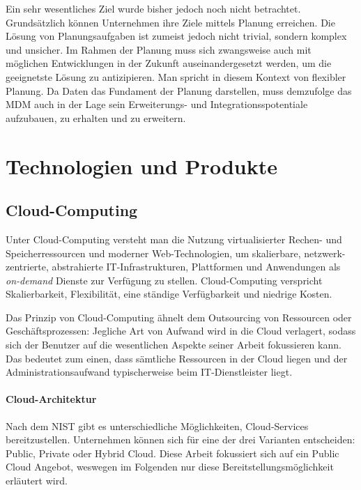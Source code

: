 Ein sehr wesentliches Ziel wurde bisher jedoch noch nicht betrachtet. Grundsätzlich können Unternehmen ihre Ziele mittels Planung erreichen. Die Lösung von Planungsaufgaben ist zumeist jedoch nicht trivial, sondern komplex und unsicher. Im Rahmen der Planung muss sich zwangsweise auch mit möglichen Entwicklungen in der Zukunft auseinandergesetzt werden, um die geeignetste Lösung zu antizipieren. Man spricht in diesem Kontext von flexibler Planung. Da Daten das Fundament der Planung darstellen, muss demzufolge das \ac{MDM} auch in der Lage sein Erweiterungs- und Integrationsspotentiale aufzubauen, zu erhalten und zu erweitern. 
\autocite{Keuper.2010}
% 
% 
% 
% 
% 
% 
\section{Technologien und Produkte}

\subsection{Cloud-Computing}
Unter Cloud-Computing versteht man die Nutzung virtualisierter Rechen- und Speicherressourcen und moderner Web-Technologien, um skalierbare, netzwerk-zentrierte, abstrahierte \ac{IT}-Infrastrukturen, Plattformen und Anwendungen als \textit{on-demand} Dienste zur Verfügung zu stellen. Cloud-Computing verspricht Skalierbarkeit, Flexibilität, eine ständige Verfügbarkeit und niedrige Kosten. 
\autocite{Sosinsky.2011}

Das Prinzip von Cloud-Computing ähnelt dem Outsourcing von Ressourcen oder Geschäftsprozessen: Jegliche Art von Aufwand wird in die Cloud verlagert, sodass sich der Benutzer auf die wesentlichen Aspekte seiner Arbeit fokussieren kann. Das bedeutet zum einen, dass sämtliche Ressourcen in der Cloud liegen und der Administrationsaufwand typischerweise beim  \ac{IT}-Dienstleister liegt. 
\autocite{Repschlager.2010}

\paragraph{Cloud-Architektur} 

Nach dem \ac{NIST} gibt es unterschiedliche Möglichkeiten, Cloud-Services bereitzustellen. Unternehmen können sich für eine der drei Varianten entscheiden: Public, Private oder Hybrid Cloud. 
\autocite{Sosinsky.2011}
Diese Arbeit fokussiert sich auf ein Public Cloud Angebot, weswegen im Folgenden nur diese Bereitstellungsmöglichkeit erläutert wird. 


